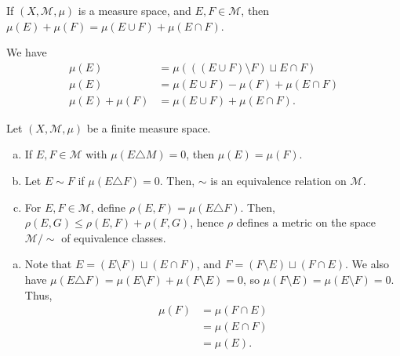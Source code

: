 \documentclass[10pt]{mypackage}
\begin{document}
\begin{exercise}[Exercise 9]
  If $\left(X,\mathcal{M},\mu\right)$ is a measure space, and $E,F\in \mathcal{M}$, then $\mu\left(E\right) + \mu\left(F\right) = \mu\left(E\cup F\right) + \mu\left(E\cap F\right)$.
\end{exercise}
\begin{solution}
  We have
  \begin{align*}
    \mu\left(E\right) &= \mu\left(\left(\left(E\cup F\right)\setminus F\right)\sqcup E\cap F\right)\\
    \mu\left(E\right) &= \mu\left(E\cup F\right) - \mu\left(F\right) + \mu\left(E\cap F\right)\\
    \mu\left(E\right) + \mu\left(F\right) &= \mu\left(E\cup F\right) + \mu\left(E\cap F\right).
  \end{align*}
\end{solution}
\begin{exercise}[Exercise 12]
Let $\left(X,\mathcal{M},\mu\right)$ be a finite measure space.
\begin{enumerate}[(a)]
  \item If $E,F\in \mathcal{M}$ with $\mu\left(E\triangle M\right) = 0$, then $\mu\left(E\right) = \mu\left(F\right)$.
  \item Let $E\sim F$ if $\mu\left(E\triangle F\right) = 0$. Then, $\sim$ is an equivalence relation on $\mathcal{M}$.
  \item For $E,F\in \mathcal{M}$, define $\rho\left(E,F\right) = \mu\left(E\triangle F\right)$. Then, $\rho\left(E,G\right)\leq \rho\left(E,F\right) + \rho\left(F,G\right)$, hence $\rho$ defines a metric on the space $\mathcal{M}/\sim$ of equivalence classes.
\end{enumerate}
\end{exercise}
\begin{solution}\hfill
  \begin{enumerate}[(a)]
    \item Note that $E = \left(E\setminus F\right) \sqcup \left(E\cap F\right)$, and $F = \left(F\setminus E\right)\sqcup \left(F\cap E\right)$. We also have $\mu\left(E\triangle F\right) = \mu\left(E\setminus F\right) + \mu\left(F\setminus E\right) = 0$, so $\mu\left(F\setminus E\right) = \mu\left(E\setminus F\right) = 0$. Thus,
      \begin{align*}
        \mu\left(F\right) &= \mu\left(F\cap E\right)\\
        &= \mu\left(E\cap F\right)\\
        &= \mu\left(E\right).
      \end{align*}
  \end{enumerate}
\end{solution}
\end{document}
